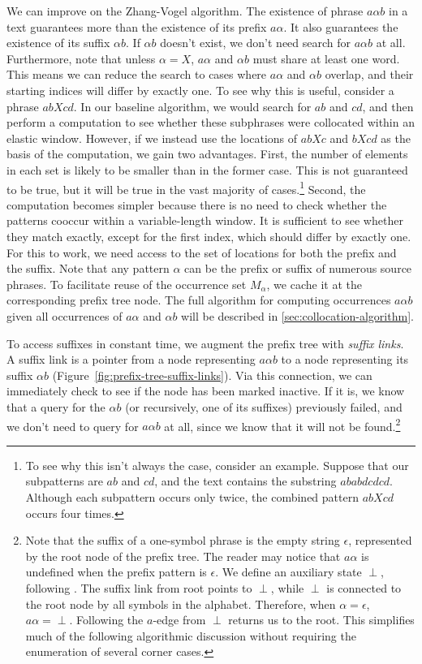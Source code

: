 We can improve on the Zhang-Vogel algorithm.
The existence of phrase $a\alpha{}b$ in a text
guarantees more than the existence of its prefix
$a\alpha$.  It also guarantees the existence of
its suffix $\alpha{}b$.  If $\alpha{}b$ doesn't exist,
we don't need search for $a\alpha{}b$ at all.  
Furthermore, note that unless $\alpha=X$, $a\alpha$ and
$\alpha{}b$ must share at least one word.  This means
we can reduce the search to cases where $a\alpha$ and 
$\alpha{}b$ overlap, and their starting indices will differ
by exactly one.  To see why this
is useful, consider a phrase $abXcd$.   In our 
baseline algorithm, we would search for $ab$ and 
$cd$, and then perform a computation to see whether these
subphrases were collocated within an elastic window.
However, if we instead use the locations of $abXc$ and $bXcd$ as the basis
of the computation, we gain two advantages.  First, the
number of elements in each set is likely to be smaller than
in the former case.  This is not guaranteed to be true, but
it will be true in the vast majority of cases.\footnote{
To see why this isn't always the case, consider an example.
Suppose that our subpatterns are $ab$ and $cd$, and the 
text contains the substring $ababdcdcd$.  Although each
subpattern occurs only twice, the combined pattern $abXcd$
occurs four times.}
Second, the computation becomes
simpler because there is no need to check whether
the patterns cooccur within a variable-length window.
It is sufficient to see whether they match exactly,
except for the first index, which should differ by 
exactly one.  For this to work, we need
access to the set of locations for both the
prefix and the suffix.  Note that any
pattern $\alpha$ can be the prefix or suffix of numerous source
phrases.  To facilitate reuse of the
occurrence set $M_\alpha$, we cache it at the
corresponding prefix tree node.  The full algorithm
for computing occurrences $a\alpha{}b$ given all
occurrences of $a\alpha$ and $\alpha{}b$ will be described
in \textsection\ref{sec:collocation-algorithm}.

To access suffixes in constant time, we augment
the prefix tree with {\em suffix links}.  A suffix link 
is a pointer from a node representing $a\alpha{}b$ to a node 
representing its suffix $\alpha{}b$ (Figure~\ref{fig:prefix-tree-suffix-links}).
Via this connection, we can immediately check to see if 
the node has been marked inactive.  If it is, we know that a query
for the $\alpha{}b$ (or recursively, one of its suffixes) previously
failed, and we don't need to query for $a\alpha{}b$ at all, since
we know that it will not be found.\footnote{Note that the suffix 
of a one-symbol phrase is the empty string $\epsilon$, represented 
by the root node of the prefix tree.  The reader may notice 
that $a\alpha$ is undefined when the prefix pattern is 
$\epsilon$.  We define an auxiliary state $\perp$, 
following \citet{Ukkonen:1995:algorithmica}.  The suffix link from root
points to $\perp$, while $\perp$ is connected to the root node 
by all symbols in the alphabet.  Therefore, when $\alpha = \epsilon$,
$a\alpha = \perp$.  Following the $a$-edge from $\perp$ 
returns us to the root.  This simplifies much of the following
algorithmic discussion without requiring the enumeration of several
corner cases.}

